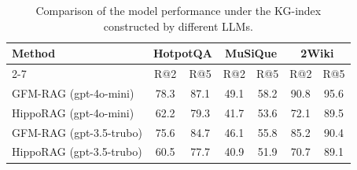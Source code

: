 \begin{table}[]
\centering
\caption{Comparison of the model performance under the KG-index constructed by different LLMs. }
\label{tab:kg_index_llm}
\begin{tabular}{@{}l|cc|cc|cc@{}}
\toprule
\multirow{2}{*}{Method}  & \multicolumn{2}{c|}{HotpotQA} & \multicolumn{2}{c|}{MuSiQue} & \multicolumn{2}{c}{2Wiki} \\ \cmidrule(l){2-7} 
                         & R@2           & R@5           & R@2           & R@5          & R@2         & R@5         \\ \midrule
GFM-RAG (gpt-4o-mini)    & 78.3          & 87.1          & 49.1          & 58.2         & 90.8        & 95.6        \\
HippoRAG (gpt-4o-mini)   & 62.2          & 79.3          & 41.7          & 53.6         & 72.1        & 89.5        \\ \midrule
GFM-RAG (gpt-3.5-trubo)  & 75.6          & 84.7          & 46.1          & 55.8         & 85.2        & 90.4        \\
HippoRAG (gpt-3.5-trubo) & 60.5          & 77.7          & 40.9          & 51.9         & 70.7        & 89.1        \\ \bottomrule
\end{tabular}%
\end{table}